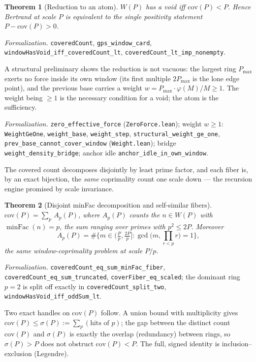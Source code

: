 \documentclass[11pt,a4paper]{amsart}
\theoremstyle{plain}
\newtheorem{theorem}{Theorem}[section]
\theoremstyle{definition}
\theoremstyle{plain}
\theoremstyle{remark}
\newcommand{\lean}[1]{\textup{\texttt{#1}}}
\newcommand{\Formal}[1]{\par\smallskip\noindent\emph{Formalization.} #1\par\smallskip}
\begin{document}
\begin{theorem}[Reduction to an atom]\label{thm:atom}
$W(P)$ has a void iff $\mathrm{cov}(P)<P$. Hence Bertrand at scale $P$ is equivalent to the
single positivity statement $P-\mathrm{cov}(P)>0$.
\end{theorem}

\Formal{\lean{coveredCount}, \lean{gps\_window\_card},
\lean{windowHasVoid\_iff\_coveredCount\_lt}, \lean{coveredCount\_lt\_imp\_nonempty}.}

A structural preliminary shows the reduction is not vacuous: the largest ring
$P_{\max}$ exerts no force inside its own window (its first multiple $2P_{\max}$ is the
lone edge point), and the previous base carries a weight $w=P_{\max}\cdot\varphi(M)/M\ge1$.
The weight being $\ge1$ is the necessary condition for a void; the atom is the sufficiency.

\Formal{\lean{zero\_effective\_force} (\lean{ZeroForce.lean}); weight
$w\ge1$: \lean{WeightGeOne}, \lean{weight\_base}, \lean{weight\_step},
\lean{structural\_weight\_ge\_one}, \lean{prev\_base\_cannot\_cover\_window}
(\lean{Weight.lean}); bridge \lean{weight\_density\_bridge}; anchor idle
\lean{anchor\_idle\_in\_own\_window}.}

The covered count decomposes disjointly by least prime factor, and each fiber is, by an
exact bijection, the \emph{same} coprimality count one scale down --- the recursion engine
promised by scale invariance.

\begin{theorem}[Disjoint minFac decomposition and self-similar fibers]\label{thm:fiber}
$\displaystyle \mathrm{cov}(P)=\sum_{p}\, A_p(P)$, where $A_p(P)$ counts the $n\in W(P)$
with $\operatorname{minFac}(n)=p$, the sum ranging over primes with $p^2\le 2P$. Moreover
\[
A_p(P)=\#\Big\{m\in\big(\tfrac{P}{p},\tfrac{2P}{p}\big]:
\gcd\big(m,\textstyle\prod_{r<p}r\big)=1\Big\},
\]
the same window-coprimality problem at scale $P/p$.
\end{theorem}

\Formal{\lean{coveredCount\_eq\_sum\_minFac\_fiber},
\lean{coveredCount\_eq\_sum\_truncated}, \lean{coverFiber\_eq\_scaled};
the dominant ring $p=2$ is split off exactly in \lean{coveredCount\_split\_two},
\lean{windowHasVoid\_iff\_oddSum\_lt}.}

Two exact handles on $\mathrm{cov}(P)$ follow. A union bound with multiplicity gives
$\mathrm{cov}(P)\le\sigma(P):=\sum_{p}(\text{hits of }p)$; the gap between the distinct
count $\mathrm{cov}(P)$ and $\sigma(P)$ is exactly the overlap (redundancy) between rings,
so $\sigma(P)>P$ does not obstruct $\mathrm{cov}(P)<P$. The full, signed identity is
inclusion--exclusion (Legendre).
\end{document}
